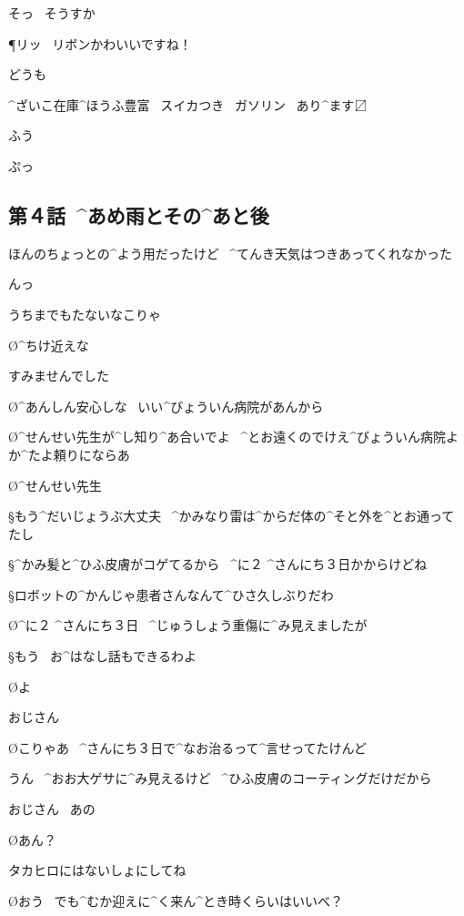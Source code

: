 \A そっ
\ そうすか

\P リッ
\ リボンかわいいですね！

\A どうも

\page
\Sign ^{ざいこ}{在庫}^{ほうふ}{豊富}
\ スイカつき
\ ガソリン
\ あり^{ます}{〼}

\A ふう

\A ぷっ


\subsection{第４話\ ^{あめ}{雨}とその^{あと}{後}}

\page[80]
\A ほんのちょっとの^{よう}{用}だったけど
\ ^{てんき}{天気}はつきあってくれなかった

\A んっ

\page
\A うちまでもたないなこりゃ

\page[83]
\O ^{ちけ}{近}えな

\page[85]
\A すみませんでした

\O ^{あんしん}{安心}しな
\ いい^{びょういん}{病院}があんから

\O ^{せんせい}{先生}が^{し}{知}り^{あ}{合}いでよ
\ ^{とお}{遠}くのでけえ^{びょういん}{病院}よか^{たよ}{頼}りにならあ

\page[88]
\O ^{せんせい}{先生}

\S もう^{だいじょうぶ}{大丈夫}
\ ^{かみなり}{雷}は^{からだ}{体}の^{そと}{外}を^{とお}{通}ってたし

\S ^{かみ}{髪}と^{ひふ}{皮膚}がコゲてるから
\ ^{に}{２} ^{さんにち}{３日}かからけどね

\S ロボットの^{かんじゃ}{患者}さんなんて^{ひさ}{久}しぶりだわ

\O ^{に}{２} ^{さんにち}{３日}
\ ^{じゅうしょう}{重傷}に^{み}{見}えましたが

\S もう
\ お^{はなし}{話}もできるわよ

\page
\O よ

\A おじさん

\O こりゃあ
\ ^{さんにち}{３日}で^{なお}{治}るって^{言}{せ}ってたけんど

\A うん
\ ^{おお}{大}ゲサに^{み}{見}えるけど
\ ^{ひふ}{皮膚}のコーティングだけだから

\A おじさん
\ あの

\O あん？

\A タカヒロにはないしょにしてね

\page
\O おう
\ でも^{むか}{迎}えに^{く}{来}ん^{とき}{時}くらいはいいべ？

